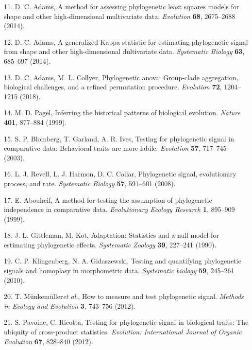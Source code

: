 \documentclass[]{article}
\begin{document}
\leavevmode\hypertarget{ref-Adams2014b}{}%
11. D. C. Adams, A method for assessing phylogenetic least squares
models for shape and other high-dimensional multivariate data.
\emph{Evolution} \textbf{68}, 2675--2688 (2014).

\leavevmode\hypertarget{ref-Adams2014a}{}%
12. D. C. Adams, A generalized Kappa statistic for estimating
phylogenetic signal from shape and other high-dimensional dultivariate
data. \emph{Systematic Biology} \textbf{63}, 685--697 (2014).

\leavevmode\hypertarget{ref-AdamsCollyer2018b}{}%
13. D. C. Adams, M. L. Collyer, Phylogenetic anova: Group-clade
aggregation, biological challenges, and a refined permutation procedure.
\emph{Evolution} \textbf{72}, 1204--1215 (2018).

\leavevmode\hypertarget{ref-Pagel1999}{}%
14. M. D. Pagel, Inferring the historical patterns of biological
evolution. \emph{Nature} \textbf{401}, 877--884 (1999).

\leavevmode\hypertarget{ref-Blomberg_et_al2003}{}%
15. S. P. Blomberg, T. Garland, A. R. Ives, Testing for phylogenetic
signal in comparative data: Behavioral traits are more labile.
\emph{Evolution} \textbf{57}, 717--745 (2003).

\leavevmode\hypertarget{ref-Revell_et_al2008}{}%
16. L. J. Revell, L. J. Harmon, D. C. Collar, Phylogenetic signal,
evolutionary process, and rate. \emph{Systematic Biology} \textbf{57},
591--601 (2008).

\leavevmode\hypertarget{ref-Abouheif1999}{}%
17. E. Abouheif, A method for testing the assumption of phylogenetic
independence in comparative data. \emph{Evolutionary Ecology Research}
\textbf{1}, 895--909 (1999).

\leavevmode\hypertarget{ref-Gittleman1990}{}%
18. J. L. Gittleman, M. Kot, Adaptation: Statistics and a null model for
estimating phylogenetic effects. \emph{Systematic Zoology} \textbf{39},
227--241 (1990).

\leavevmode\hypertarget{ref-Klingenberg2010}{}%
19. C. P. Klingenberg, N. A. Gidaszewski, Testing and quantifying
phylogenetic signals and homoplasy in morphometric data.
\emph{Systematic biology} \textbf{59}, 245--261 (2010).

\leavevmode\hypertarget{ref-Munkemuller_et_al2012}{}%
20. T. Münkemüller\emph{et al.}, How to measure and test phylogenetic
signal. \emph{Methods in Ecology and Evolution} \textbf{3}, 743--756
(2012).

\leavevmode\hypertarget{ref-Pavoine2012}{}%
21. S. Pavoine, C. Ricotta, Testing for phylogenetic signal in
biological traits: The ubiquity of cross-product statistics.
\emph{Evolution: International Journal of Organic Evolution}
\textbf{67}, 828--840 (2012).
\end{document}
